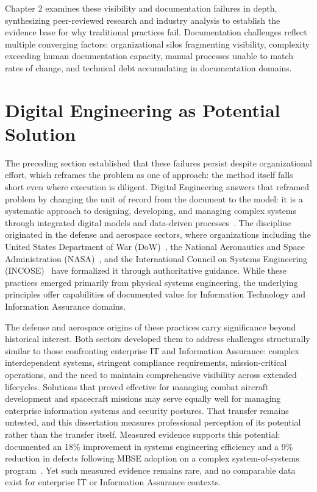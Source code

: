 Chapter 2 examines these visibility and documentation failures in depth, synthesizing peer-reviewed research and industry analysis to establish the evidence base for why traditional practices fail. Documentation challenges reflect multiple converging factors: organizational silos fragmenting visibility, complexity exceeding human documentation capacity, manual processes unable to match rates of change, and technical debt accumulating in documentation domains.

\section{Digital Engineering as Potential Solution}

The preceding section established that these failures persist despite organizational effort, which reframes the problem as one of approach: the method itself falls short even where execution is diligent. Digital Engineering answers that reframed problem by changing the unit of record from the document to the model: it is a systematic approach to designing, developing, and managing complex systems through integrated digital models and data-driven processes~\parencite{DigitalEngineeringInformationExchange}. The discipline originated in the defense and aerospace sectors, where organizations including the United States Department of War (DoW)~\parencite{DoD_Engineering_2022}, the National Aeronautics and Space Administration (NASA)~\parencite{Engineer}, and the International Council on Systems Engineering (INCOSE)~\parencite{DigitalEngineeringInformationExchange} have formalized it through authoritative guidance. While these practices emerged primarily from physical systems engineering, the underlying principles offer capabilities of documented value for Information Technology and Information Assurance domains.

The defense and aerospace origins of these practices carry significance beyond historical interest. Both sectors developed them to address challenges structurally similar to those confronting enterprise IT and Information Assurance: complex interdependent systems, stringent compliance requirements, mission-critical operations, and the need to maintain comprehensive visibility across extended lifecycles. Solutions that proved effective for managing combat aircraft development and spacecraft missions may serve equally well for managing enterprise information systems and security postures. That transfer remains untested, and this dissertation measures professional perception of its potential rather than the transfer itself. Measured evidence supports this potential: \citeauthor{Rogers_Mitchell_2021} documented an 18\% improvement in systems engineering efficiency and a 9\% reduction in defects following MBSE adoption on a complex system-of-systems program~\parencite{Rogers_Mitchell_2021}. Yet such measured evidence remains rare, and no comparable data exist for enterprise IT or Information Assurance contexts.

